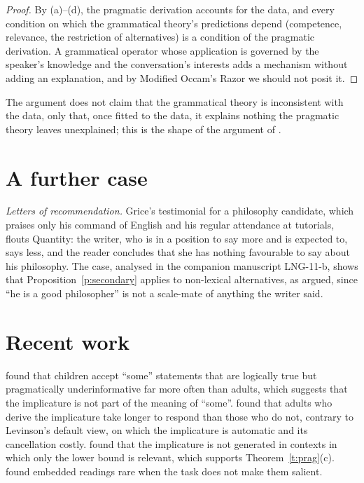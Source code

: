 \documentclass{situationist-preprint}
\begin{document}
\begin{proof}
By (a)--(d), the pragmatic derivation accounts for the data, and every condition on which the grammatical theory's predictions depend (competence, relevance, the restriction of alternatives) is a condition of the pragmatic derivation. A grammatical operator whose application is governed by the speaker's knowledge and the conversation's interests adds a mechanism without adding an explanation, and by Modified Occam's Razor we should not posit it.
\end{proof}

The argument does not claim that the grammatical theory is inconsistent with the data, only that, once fitted to the data, it explains nothing the pragmatic theory leaves unexplained; this is the shape of the argument of \citet{Geurts2010}.

\section{A further case}

\emph{Letters of recommendation.} Grice's testimonial for a philosophy candidate, which praises only his command of English and his regular attendance at tutorials, flouts Quantity: the writer, who is in a position to say more and is expected to, says less, and the reader concludes that she has nothing favourable to say about his philosophy. The case, analysed in the companion manuscript LNG-11-b, shows that Proposition~\ref{p:secondary} applies to non-lexical alternatives, as \citet{Hirschberg1985} argued, since \enquote{he is a good philosopher} is not a scale-mate of anything the writer said.

\section{Recent work}\label{s:recent}

\citet{Noveck2001} found that children accept \enquote{some} statements that are logically true but pragmatically underinformative far more often than adults, which suggests that the implicature is not part of the meaning of \enquote{some}. \citet{BottNoveck2004} found that adults who derive the implicature take longer to respond than those who do not, contrary to Levinson's default view, on which the implicature is automatic and its cancellation costly. \citet{BrehenyKatsosWilliams2006} found that the implicature is not generated in contexts in which only the lower bound is relevant, which supports Theorem~\ref{t:prag}(c). \citet{GeurtsPouscoulous2009} found embedded readings rare when the task does not make them salient.
\end{document}
